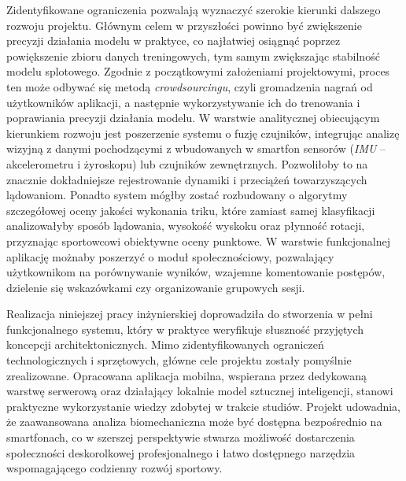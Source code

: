     Zidentyfikowane ograniczenia pozwalają wyznaczyć szerokie kierunki dalszego rozwoju projektu. Głównym celem w przyszłości powinno być zwiększenie precyzji działania modelu w praktyce, co najłatwiej osiągnąć poprzez powiększenie zbioru danych treningowych, tym samym zwiększając stabilność modelu splotowego. Zgodnie z początkowymi założeniami projektowymi, proces ten może odbywać się metodą \textit{crowdsourcingu}, czyli gromadzenia nagrań od użytkowników aplikacji, a następnie wykorzystywanie ich do trenowania i poprawiania precyzji działania modelu. W warstwie analitycznej obiecującym kierunkiem rozwoju jest poszerzenie systemu o fuzję czujników, integrując analizę wizyjną z danymi pochodzącymi z wbudowanych w smartfon sensorów (\textit{IMU} – akcelerometru i żyroskopu) lub czujników zewnętrznych. Pozwoliłoby to na znacznie dokładniejsze rejestrowanie dynamiki i przeciążeń towarzyszących lądowaniom. Ponadto system mógłby zostać rozbudowany o algorytmy szczegółowej oceny jakości wykonania triku, które zamiast samej klasyfikacji analizowałyby sposób lądowania, wysokość wyskoku oraz płynność rotacji, przyznając sportowcowi obiektywne oceny punktowe. W warstwie funkcjonalnej aplikację możnaby poszerzyć o moduł społecznościowy, pozwalający użytkownikom na porównywanie wyników, wzajemne komentowanie postępów, dzielenie się wskazówkami czy organizowanie grupowych sesji.

    Realizacja niniejszej pracy inżynierskiej doprowadziła do stworzenia w pełni funkcjonalnego systemu, który w praktyce weryfikuje słuszność przyjętych koncepcji architektonicznych. Mimo zidentyfikowanych ograniczeń technologicznych i sprzętowych, główne cele projektu zostały pomyślnie zrealizowane. Opracowana aplikacja mobilna, wspierana przez dedykowaną warstwę serwerową oraz działający lokalnie model sztucznej inteligencji, stanowi praktyczne wykorzystanie wiedzy zdobytej w trakcie studiów. Projekt udowadnia, że zaawansowana analiza biomechaniczna może być dostępna bezpośrednio na smartfonach, co w szerszej perspektywie stwarza możliwość dostarczenia społeczności deskorolkowej profesjonalnego i łatwo dostępnego narzędzia wspomagającego codzienny rozwój sportowy.